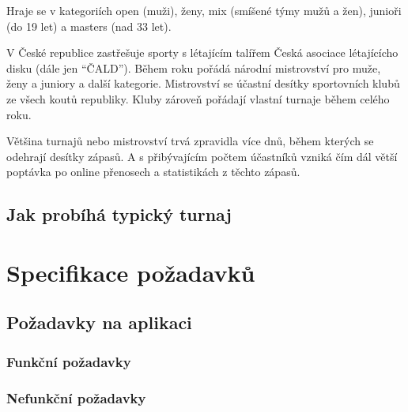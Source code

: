 \documentclass[thesis=B,czech]{FITthesis}[2012/06/26]
\begin{document}
Hraje se v kategoriích open (muži), ženy, mix (smíšené týmy mužů a žen), junioři (do 19 let) a masters (nad 33 let).

\indent

V České republice zastřešuje sporty s létajícím talířem Česká asociace
lé\-ta\-jícícho disku (dále jen ``ČALD''). Během roku pořádá národní mistrovství 
pro muže, ženy a juniory a další kategorie. Mistrovství se účastní desítky
sportovních klubů ze všech koutů republiky. Kluby zároveň pořádají vlastní
turnaje během celého roku.

\medskip

Většina turnajů nebo mistrovství trvá zpravidla více dnů, během kterých se odehrají desítky zápasů. A s přibývajícím počtem účastníků vzniká čím dál větší
poptávka po online přenosech a statistikách z těchto zápasů.




\section{Jak probíhá typický turnaj}


\chapter{Specifikace požadavků}


\section{Požadavky na aplikaci}

\subsection{Funkční požadavky}

\subsection{Nefunkční požadavky}
\end{document}
